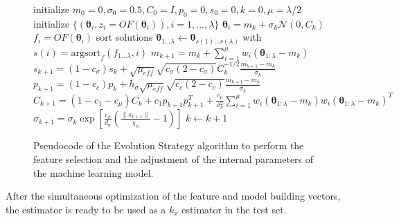\documentclass[a4paper,12pt, english]{article}
\newcommand{\xp}{\bm{\theta}}
\begin{document}
\begin{figure}[!htb]
\begin{algorithmic}[1]
\STATE initialize $m_0=0, \sigma_0=0.5, C_0=I, p_0=0, s_0=0, k=0, \mu=\lambda/2$ \label{lin:init-0}
\STATE initialize $\{ (\xp_i, z_i=OF(\xp_i)), i=1, \dots, \lambda \}$ \label{lin:init-1}
        \STATE $\xp_i = m_k + \sigma_k \mathcal  {N}(0, C_k)$ \label{lin:sample-1}
        \STATE $f_i = OF(\xp_i)$ \label{lin:sample-2} %
    \ENDFOR 
    \STATE sort solutions $\xp_{{1...\lambda }} \gets \xp_{{s(1)...s(\lambda )}}$ with $s(i) = {\mathrm{argsort}_{f}}
(f_{{1...\lambda }},  i) $ \label{lin:sort-1}
    \STATE $m_{k+1} = m_k + \sum_{i=1}^{\mu} w_i (\xp_{1:\lambda} - m_k) $ \label{lin:mean-2}
    \STATE $s_{k+1} = (1-c_{\sigma})s_k + \sqrt{\mu_{eff}}\sqrt{c_{\sigma}(2-c_{\sigma})} C_{k}^{-1/2}\frac{m_{k+1}-m_k}{\sigma_k} $ \label{lin:path-1}
    \STATE $p_{k+1} = (1-c_c)p_k + h_{\sigma}\sqrt{\mu_{eff}}\sqrt{c_c(2-c_c)}  \frac{m_{k+1}-m_k}{\sigma_k}$ \label{lin:path-2}
    \STATE $C_{k+1} = (1-c_1-c_{\mu})C_k + c_1p_{k+1}p_{k+1}^T 
 +\frac{c_{\mu}}{\sigma_k^2} \sum_{i=1}^{\mu}  w_i (\xp_{1:\lambda} - m_k)w_i (\xp_{1:\lambda} - m_k)^T$ \label{lin:adapt-1}
    \STATE $\sigma_{k+1} = \sigma_k \exp{\left[ \frac{c_{\sigma}}{d_{\sigma}} \left( \frac{\|s_{k+1}\|}{ \chi_n } - 1 \right) \right]} $ \label{lin:adapt-2}
    \STATE $k\gets k+1$
\ENDWHILE 
\end{algorithmic}
\caption{\label{fig:algo_cmaes} 
Pseudocode of the Evolution Strategy algorithm to perform the feature selection and the adjustment of the internal parameters of the machine learning model.
}
\end{figure}


After the simultaneous optimization of the feature and model building vectors, the estimator is ready to be used as a $k_x$ estimator in the test set.


\end{document}
